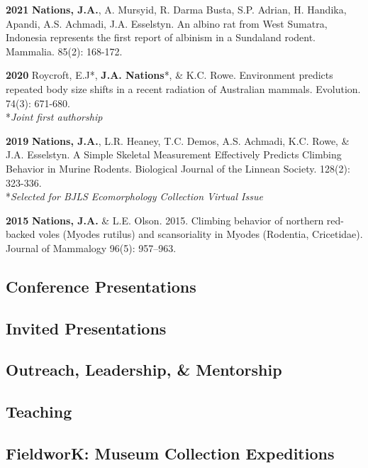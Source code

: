 \documentclass[
]{article}
\begin{document}
\textbf{2021} \textbar{} \textbf{Nations, J.A.}, A. Mursyid, R. Darma
Busta, S.P. Adrian, H. Handika, Apandi, A.S. Achmadi, J.A. Esselstyn. An
albino rat from West Sumatra, Indonesia represents the first report of
albinism in a Sundaland rodent. Mammalia. 85(2): 168-172.

\textbf{2020} \textbar{} Roycroft, E.J*, \textbf{J.A. Nations}*, \& K.C.
Rowe. Environment predicts repeated body size shifts in a recent
radiation of Australian mammals. Evolution. 74(3): 671-680.\\
*\emph{Joint first authorship}

\textbf{2019} \textbar{} \textbf{Nations, J.A.}, L.R. Heaney, T.C.
Demos, A.S. Achmadi, K.C. Rowe, \& J.A. Esselstyn. A Simple Skeletal
Measurement Effectively Predicts Climbing Behavior in Murine Rodents.
Biological Journal of the Linnean Society. 128(2): 323-336.\\
*\emph{Selected for BJLS Ecomorphology Collection Virtual Issue}

\textbf{2015} \textbar{} \textbf{Nations, J.A.} \& L.E. Olson. 2015.
Climbing behavior of northern red-backed voles (Myodes rutilus) and
scansoriality in Myodes (Rodentia, Cricetidae). Journal of Mammalogy
96(5): 957--963.\\

\hypertarget{conference-presentations}{%
\subsection{Conference Presentations}\label{conference-presentations}}

\hypertarget{invited-presentations}{%
\subsection{Invited Presentations}\label{invited-presentations}}

\hypertarget{outreach-leadership-mentorship}{%
\subsection{Outreach, Leadership, \&
Mentorship}\label{outreach-leadership-mentorship}}

\hypertarget{teaching}{%
\subsection{Teaching}\label{teaching}}

\hypertarget{fieldwork-museum-collection-expeditions}{%
\subsection{FieldworK: Museum Collection
Expeditions}\label{fieldwork-museum-collection-expeditions}}
\end{document}
